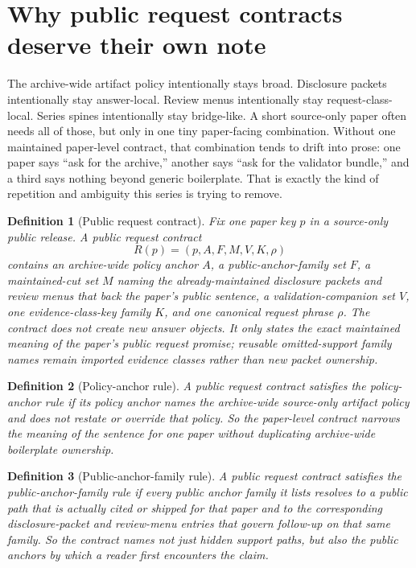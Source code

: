 \documentclass[11pt]{article}
\newtheorem{definition}{Definition}
\begin{document}
\section{Why public request contracts deserve their own note}
The archive-wide artifact policy intentionally stays broad.
Disclosure packets intentionally stay answer-local.
Review menus intentionally stay request-class-local.
Series spines intentionally stay bridge-like.
A short source-only paper often needs all of those, but only in one tiny paper-facing combination.
Without one maintained paper-level contract, that combination tends to drift into prose: one paper says ``ask for the archive,'' another says ``ask for the validator bundle,'' and a third says nothing beyond generic boilerplate.
That is exactly the kind of repetition and ambiguity this series is trying to remove.

\begin{definition}[Public request contract]
Fix one paper key $p$ in a source-only public release.
A \emph{public request contract}
\[
R(p)=(p,A,F,M,V,K,\rho)
\]
contains an archive-wide policy anchor $A$, a public-anchor-family set $F$, a maintained-cut set $M$ naming the already-maintained disclosure packets and review menus that back the paper's public sentence, a validation-companion set $V$, one evidence-class-key family $K$, and one canonical request phrase $\rho$.
The contract does not create new answer objects.
It only states the exact maintained meaning of the paper's public request promise; reusable omitted-support family names remain imported evidence classes rather than new packet ownership.
\end{definition}

\begin{definition}[Policy-anchor rule]
A public request contract satisfies the \emph{policy-anchor rule} if its policy anchor names the archive-wide source-only artifact policy and does not restate or override that policy.
So the paper-level contract narrows the meaning of the sentence for one paper without duplicating archive-wide boilerplate ownership.
\end{definition}

\begin{definition}[Public-anchor-family rule]
A public request contract satisfies the \emph{public-anchor-family rule} if every public anchor family it lists resolves to a public path that is actually cited or shipped for that paper and to the corresponding disclosure-packet and review-menu entries that govern follow-up on that same family.
So the contract names not just hidden support paths, but also the public anchors by which a reader first encounters the claim.
\end{definition}
\end{document}

